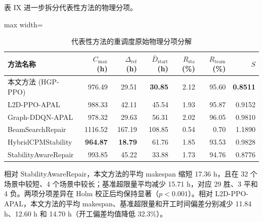 \documentclass[journal,10pt]{IEEEtran}
\renewcommand{\arraystretch}{1.04}
\begin{document}
表 IX 进一步拆分代表性方法的物理分项。

\begin{table}[!t]
\centering
\caption{代表性方法的重调度原始物理分项分解}
\label{tab:raw_components}
\setlength{\tabcolsep}{2.5pt}
\renewcommand{\arraystretch}{0.92}
\begin{adjustbox}{max width=\columnwidth}
\begin{tabular}{@{}lrrrrrr@{}}
\toprule
\textbf{方法名称} & $C_{\max}$ (h) & $\Delta_{\mathrm{ref}}$ (h) & $\bar D_{\mathrm{start}}$ (h) & $R_{\mathrm{sta}}$ (\%) & $R_{\mathrm{team}}$ (\%) & $S$ \\
\midrule
本文方法 (HGP-PPO) & 976.49 & 29.51 & \textbf{30.85} & 2.12 & 95.60 & \textbf{0.8511} \\
L2D-PPO-APAL & 988.33 & 42.11 & 45.54 & 1.93 & 95.87 & 0.9152 \\
Graph-DDQN-APAL & 978.32 & 29.63 & 56.31 & 2.02 & 96.05 & 0.9810 \\
BeamSearchRepair & 1116.52 & 167.19 & 108.85 & 0.54 & 0.70 & 1.1890 \\
HybridCPMStability & \textbf{964.87} & \textbf{18.79} & 61.76 & 1.85 & 93.53 & 0.9828 \\
StabilityAwareRepair & 993.85 & 45.22 & 33.88 & 1.73 & 94.76 & 0.8776 \\
\bottomrule
\end{tabular}
\end{adjustbox}
\vspace{2pt}
\par{}\par
\end{table}

相对 Stability\allowbreak{}Aware\allowbreak{}Repair，本文方法的平均 makespan 缩短 17.36 h，且在 32 个场景中较短、4 个场景中较长；基准超限量平均减少 15.71 h，对应 29 胜、3 平和 4 负。两项分项差异在 Holm 校正后均保持显著（$p<0.001$）。相对 L2D-PPO-APAL，本文方法的平均 makespan、基准超限量和开工时间偏差分别减少 11.84 h、12.60 h 和 14.70 h（开工偏差均值降低 32.3\%）。
\end{document}
